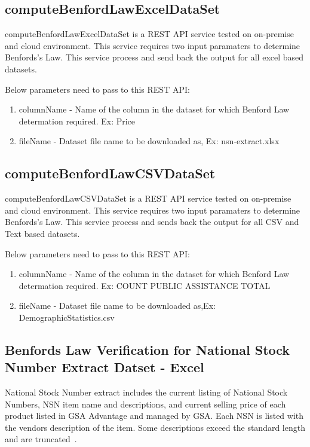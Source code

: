 \subsection{computeBenfordLawExcelDataSet}
computeBenfordLawExcelDataSet is a REST API service tested on 
on-premise and cloud environment. This service requires two 
input paramaters to determine Benfords's Law. This service
process and send back the output 
for all excel based datasets.

Below parameters need to pass to this REST API:

\begin{enumerate}
\item columnName - Name of the column in the 
 dataset for which Benford Law determation required. 
 Ex: Price
\item fileName - Dataset file name to be downloaded 
 as, Ex: nsn-extract.xlsx
\end{enumerate}

\subsection{computeBenfordLawCSVDataSet}
computeBenfordLawCSVDataSet is a REST API service 
tested on on-premise and cloud environment. 
This service requires two input paramaters to 
determine Benfords's Law. This service
process and sends back the output 
for all CSV and Text based datasets.

Below parameters need to pass to this REST API:

\begin{enumerate}
\item columnName - Name of the column in the 
 dataset for which Benford Law determation required. 
 Ex: COUNT PUBLIC ASSISTANCE TOTAL
\item fileName - Dataset file name to be downloaded 
 as,Ex: DemographicStatistics.csv
\end{enumerate}

\subsection{Benfords Law Verification for National Stock 
Number Extract Datset - Excel}
National Stock Number extract includes the current 
listing of National Stock Numbers, 
NSN item name and descriptions, and current 
selling price of each product listed in GSA 
Advantage and managed by GSA. Each NSN is 
listed with the vendors description of the item. 
Some descriptions exceed the standard length and are 
truncated~\cite{hid-sp18-514-nsn-ds-desc}.

